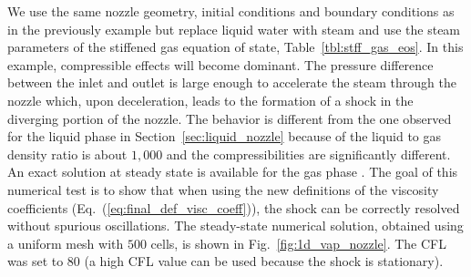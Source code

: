 \documentclass[review,10pt]{elsarticle}
\newcommand{\eqt}[1]{Eq.~(\ref{#1})}                     %
\newcommand{\fig}[1]{Fig.~\ref{#1}}                      %
\newcommand{\tbl}[1]{Table~\ref{#1}}                     %
\newcommand{\sct}[1]{Section~\ref{#1}}                   %
\begin{document}
We use the same nozzle geometry, initial conditions and boundary conditions as in the previously example but replace liquid water 
with steam and use the steam parameters of the stiffened gas equation of state, \tbl{tbl:stff_gas_eos}. In this example, 
compressible effects will become dominant. 
The pressure difference between the inlet and outlet is large enough to accelerate the steam through the nozzle which, upon deceleration, leads 
to the formation of a shock in the diverging portion of the nozzle. The behavior is different from the one observed for the 
liquid phase in \sct{sec:liquid_nozzle} because of the liquid to gas density ratio is about $1,000$ 
and the compressibilities are significantly different. An exact 
solution at steady state is available for the gas phase \cite{nozzle_exact}. The goal of this numerical test is to show that 
when using the new definitions of the viscosity coefficients (\eqt{eq:final_def_visc_coeff}), the shock can be 
correctly resolved without spurious oscillations. The steady-state numerical solution, obtained using a uniform 
mesh with $500$ cells, is shown in \fig{fig:1d_vap_nozzle}. The CFL was set to 80 (a high CFL value can be used because the shock is stationary).
\end{document}
